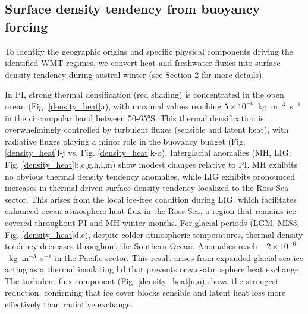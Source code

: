 \documentclass[draft]{agujournal2025}
\begin{document}





\subsection{Surface density tendency from buoyancy forcing}

To identify the geographic origins and specific physical components driving the identified WMT regimes, we convert heat and freshwater fluxes into surface density tendency during austral winter (see Section 2 for more details).

In PI, strong thermal densification (red shading) is concentrated in the open ocean (Fig. \ref{density_heat}a), with maximal values reaching $5 \times 10^{-6}$~kg~m$^{-3}$~s$^{-1}$ in the circumpolar band between 50-65°S. This thermal densification is overwhelmingly controlled by turbulent fluxes (sensible and latent heat), with radiative fluxes playing a minor role in the buoyancy budget (Fig. \ref{density_heat}f-j vs. Fig. \ref{density_heat}k-o).
Interglacial anomalies (MH, LIG; Fig. \ref{density_heat}b,c,g,h,l,m) show modest changes relative to PI. MH exhibits no obvious thermal density tendency anomalies, while
LIG exhibits pronounced increases in thermal-driven surface density tendency  localized to the Ross Sea sector. This arises from the local ice-free condition during LIG, which facilitates enhanced ocean-atmosphere heat flux in the Ross Sea, a region that remains ice-covered throughout PI and MH winter months.
For glacial periods (LGM, MIS3; Fig. \ref{density_heat}d,e), despite colder atmospheric temperatures, thermal density tendency decreases throughout the Southern Ocean. Anomalies reach $-2 \times 10^{-6}$~kg~m$^{-3}$~s$^{-1}$ in the Pacific sector. This result arises from expanded glacial sea ice acting as a thermal insulating lid that prevents ocean-atmosphere heat exchange. The turbulent flux component (Fig. \ref{density_heat}n,o) shows the strongest reduction, confirming that ice cover blocks sensible and latent heat loss more effectively than radiative exchange.
\end{document}

